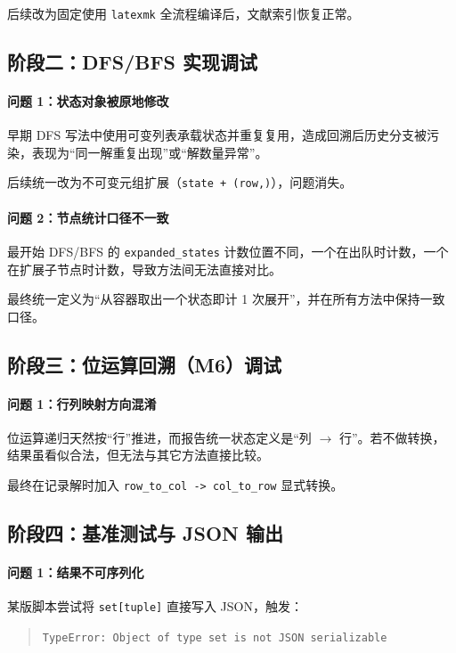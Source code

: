 后续改为固定使用 \texttt{latexmk} 全流程编译后，文献索引恢复正常。

\subsection{阶段二：DFS/BFS 实现调试}

\paragraph{问题 1：状态对象被原地修改}
早期 DFS 写法中使用可变列表承载状态并重复复用，造成回溯后历史分支被污染，表现为“同一解重复出现”或“解数量异常”。

后续统一改为不可变元组扩展（\texttt{state + (row,)}），问题消失。

\paragraph{问题 2：节点统计口径不一致}
最开始 DFS/BFS 的 \texttt{expanded\_states} 计数位置不同，一个在出队时计数，一个在扩展子节点时计数，导致方法间无法直接对比。

最终统一定义为“从容器取出一个状态即计 1 次展开”，并在所有方法中保持一致口径。

\subsection{阶段三：位运算回溯（M6）调试}

\paragraph{问题 1：行列映射方向混淆}
位运算递归天然按“行”推进，而报告统一状态定义是“列 $\rightarrow$ 行”。若不做转换，结果虽看似合法，但无法与其它方法直接比较。

最终在记录解时加入 \texttt{row\_to\_col -> col\_to\_row} 显式转换。

\subsection{阶段四：基准测试与 JSON 输出}

\paragraph{问题 1：结果不可序列化}
某版脚本尝试将 \texttt{set[tuple]} 直接写入 JSON，触发：
\begin{quote}
    \texttt{TypeError: Object of type set is not JSON serializable}
\end{quote}


